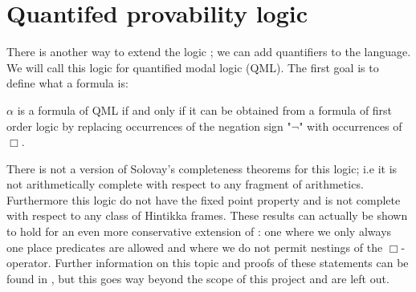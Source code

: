 \documentclass[../main.tex]{subfiles}
\begin{document}
\section{Quantifed provability logic}
There is another way to extend the logic \GL; we can add quantifiers to the
language. We will call this logic for quantified modal logic (QML). The first
goal is to define what a formula is:
\begin{defi}
	$\alpha$ is a formula of QML if and only if it can be obtained from a
	formula of first order logic by
	replacing occurrences of the negation sign "$\neg$" with occurrences of
	$\Box$. 
\end{defi}

	There is not a version of Solovay's completeness theorems for this
	logic; i.e it is not arithmetically complete with respect to any
	fragment of arithmetics. Furthermore this logic  do not have the fixed point property and
	is not complete with respect to any class of Hintikka frames. These
	results can actually be shown to hold for an even more conservative
	extension of \GL: one where we only always one place predicates are
	allowed and where we do not permit nestings of the $\Box$-operator. Further
	information on this topic and proofs of these statements can be found
	in \parencite{Boolos1993}, but this goes way beyond the scope of this
	project and are left out.
	
\end{document}
